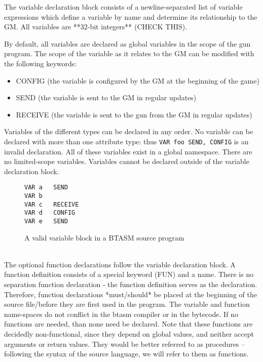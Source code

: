 \documentclass[12pt,a4paper]{scrbook}
\begin{document}
The variable declaration block consists of a newline-separated list of variable expressions
which define a variable by name and determine its relationship to the GM.  All variables are 
**32-bit integers** (CHECK THIS).  

By default, all variables are declared as global variables in the scope of the gun program.
The scope of the variable as it relates to the GM can be modified with the following keywords:
\begin{itemize}
\item CONFIG (the variable is configured by the GM at the beginning of the game)
\item SEND (the variable is sent to the GM in regular updates)
\item RECEIVE (the variable is sent to the gun from the GM in regular updates)
\end{itemize}

Variables of the different types can be declared in any order.  No variable can be declared
with more than one attribute type: thus \lstinline|VAR foo SEND, CONFIG| is an invalid
declaration.  All of these variables exist in a global namespace.  There are no limited-scope 
variables.  Variables cannot be declared outside of the variable declaration block.  

\begin{figure}[h]
\begin{lstlisting}
VAR a	SEND
VAR b
VAR c   RECEIVE
VAR d	CONFIG
VAR e	SEND
\end{lstlisting}
\caption{A valid variable block in a BTASM source program} 
\end{figure}

\ \\

The optional function declarations follow the variable declaration block.  A function definition
consists of a special keyword (FUN) and a name.  There is no separation function declaration - the
function definition serves as the declaration.  Therefore, function declarations *must/should* be
placed at the beginning of the source file/before they are first
used in the program.  The variable and function name-spaces do not
conflict in the btasm compiler or in the bytecode.  
If no functions are needed, than none need be declared.  Note 
that these functions are decidedly non-functional, since they depend on global values, and neither
accept arguments or return values.  They would be better referred to as procedures -- following the
syntax of the source language, we will refer to them as functions.
\end{document}
